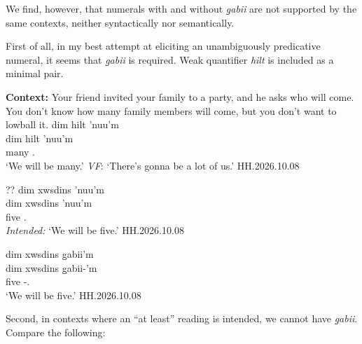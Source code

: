 \documentclass{article}
\begin{document}
We find, however, that numerals with and without \textit{g̱abii} are not supported by the same contexts, neither syntactically nor semantically. 

First of all, in my best attempt at eliciting an unambiguously predicative numeral, it seems that \textit{g̱abii} is required. Weak quantifier \textit{hilt} is included as a minimal pair. 

\begin{exe}
    \ex 
    \begin{xlist}
       \item \textbf{Context: }Your friend invited your family to a party, and he asks who will come. You don't know how many family members will come, but you don't want to lowball it.      
       \glll dim hilt 'nuu'm \\
    dim hilt 'nuu'm \\
    \Prosp{} many \Fpl{}.\Iii{} \\
    `We will be many.' \textit{VF}: `There's gonna be a lot of us.' \hfill HH.2026.10.08
        \item \glll ?? dim xwsdins 'nuu'm \\
      {} dim xwsdins 'nuu'm \\
     {} \Prosp{} five \Fpl{}.\Iii{} \\
    \textit{Intended: }`We will be five.' \hfill HH.2026.10.08
    \item \glll dim xwsdins g̱abii'm \\
     dim xwsdins g̱abii-'m \\
    \Prosp{} five \Cnt{}-\Fpl{}.\Ii{} \\
    `We will be five.' \hfill HH.2026.10.08
    \end{xlist}
\end{exe}

Second, in contexts where an ``at least'' reading is intended, we cannot have \textit{g̱abii}. Compare the following:
\end{document}
